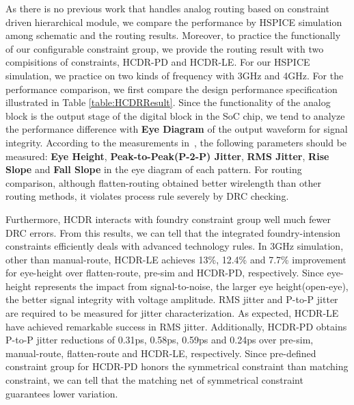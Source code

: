    As there is no previous work that handles analog routing based on constraint driven hierarchical module, we compare the performance by HSPICE simulation among schematic and the routing results. Moreover, to practice the functionally of our configurable constraint group, we provide the routing result with two compisitions of constraints, HCDR-PD and HCDR-LE. For our HSPICE simulation, we practice on two kinds of frequency with 3GHz and 4GHz. For the performance comparison, we first compare the design performance specification illustrated in Table \ref{table:HCDRResult}. Since the functionality of the analog block is the output stage of the digital block in the SoC chip, we tend to analyze the performance difference with {\bf Eye Diagram} of the output waveform for signal integrity. According to the measurements in~\cite{eyediagram}, the following parameters should be measured: {\bf Eye Height}, {\bf Peak-to-Peak(P-2-P) Jitter}, {\bf RMS Jitter}, {\bf Rise Slope} and {\bf Fall Slope} in the eye diagram of each pattern. For routing comparison, although flatten-routing obtained better wirelength than other routing methods, it violates process rule severely by DRC checking. 
    
    Furthermore, HCDR interacts with foundry constraint group well much fewer DRC errors. From this results, we can tell that the integrated foundry-intension constraints efficiently deals with advanced technology rules. In 3GHz simulation, other than manual-route, HCDR-LE achieves 13\%, 12.4\% and 7.7\% improvement for eye-height over flatten-route, pre-sim and HCDR-PD, respectively. Since eye-height represents the impact from signal-to-noise, the larger eye height(open-eye), the better signal integrity with voltage amplitude. RMS jitter and P-to-P jitter are required to be measured for jitter characterization. As expected, HCDR-LE have achieved remarkable success in RMS jitter. Additionally, HCDR-PD obtains P-to-P jitter reductions of 0.31ps, 0.58ps, 0.59ps and 0.24ps over pre-sim, manual-route, flatten-route and HCDR-LE, respectively. Since pre-defined constraint group for HCDR-PD honors the symmetrical constraint than matching constraint, we can tell that the matching net of symmetrical constraint guarantees lower variation. 
  
